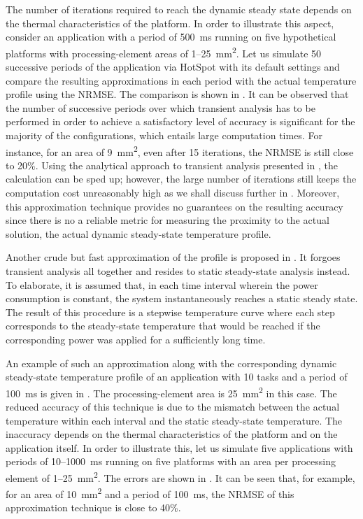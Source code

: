The number of iterations required to reach the dynamic steady state depends on
the thermal characteristics of the platform. In order to illustrate this aspect,
consider an application with a period of 500~ms running on five hypothetical
platforms with processing-element areas of 1--25~mm\textsuperscript{2}. Let us
simulate 50 successive periods of the application via HotSpot with its default
settings and compare the resulting approximations in each period with the actual
temperature profile using the \ac{NRMSE}. The comparison is shown in
. It can be observed that the number of successive
periods over which transient analysis has to be performed in order to achieve a
satisfactory level of accuracy is significant for the majority of the
configurations, which entails large computation times. For instance, for an area
of 9~mm\textsuperscript{2}, even after 15 iterations, the \ac{NRMSE} is still
close to 20\%. Using the analytical approach to transient analysis presented in
, the calculation can be sped up; however, the large
number of iterations still keeps the computation cost unreasonably high as we
shall discuss further in . Moreover, this
approximation technique provides no guarantees on the resulting accuracy since
there is no a reliable metric for measuring the proximity to the actual
solution, the actual dynamic steady-state temperature profile.

Another crude but fast approximation of the profile is proposed in
\cite{huang2009b}. It forgoes transient analysis all together and resides to
static steady-state analysis instead. To elaborate, it is assumed that, in each
time interval wherein the power consumption is constant, the system
instantaneously reaches a static steady state. The result of this procedure is a
stepwise temperature curve where each step corresponds to the steady-state
temperature that would be reached if the corresponding power was applied for a
sufficiently long time.

An example of such an approximation along with the corresponding dynamic
steady-state temperature profile of an application with 10 tasks and a period of
100~ms is given in . The processing-element
area is 25~mm\textsuperscript{2} in this case. The reduced accuracy of this
technique is due to the mismatch between the actual temperature within each
interval and the static steady-state temperature. The inaccuracy depends on the
thermal characteristics of the platform and on the application itself. In order
to illustrate this, let us simulate five applications with periods of
10--1000~ms running on five platforms with an area per processing element of
1--25~mm\textsuperscript{2}. The errors are shown in
. It can be seen that, for example, for an area
of 10~mm\textsuperscript{2} and a period of 100~ms, the \ac{NRMSE} of this
approximation technique is close to 40\%.

